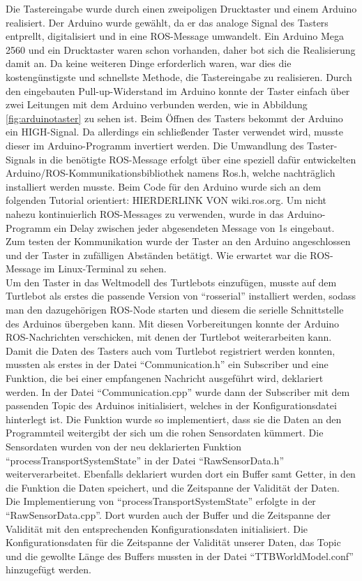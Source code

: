 \documentclass[a4paper,12pt,headsepline]{scrartcl}
\begin{document}
	Die Tastereingabe wurde durch einen zweipoligen Drucktaster und einem Arduino realisiert. Der Arduino wurde gewählt, da er das analoge Signal des Tasters entprellt, digitalisiert und in eine ROS-Message umwandelt. Ein Arduino Mega 2560 und ein Drucktaster waren schon vorhanden, daher bot sich die Realisierung damit an. Da keine weiteren Dinge erforderlich waren, war dies die kostengünstigste und schnellste Methode, die Tastereingabe zu realisieren. Durch den eingebauten Pull-up-Widerstand im Arduino konnte der Taster einfach über zwei Leitungen mit dem Arduino verbunden werden, wie in Abbildung \ref{fig:arduinotaster} zu sehen ist. Beim Öffnen des Tasters bekommt der Arduino ein HIGH-Signal. Da allerdings ein schließender Taster verwendet wird, musste dieser im Arduino-Programm invertiert werden. Die Umwandlung des Taster-Signals in die benötigte ROS-Message erfolgt über eine speziell dafür entwickelten Arduino/ROS-Kommunikationsbibliothek namens \glqq Ros.h\grqq, welche nachträglich installiert werden musste. Beim Code für den Arduino wurde sich an dem folgenden Tutorial orientiert: {HIERDERLINK VON wiki.ros.org}. Um nicht nahezu kontinuierlich ROS-Messages zu verwenden, wurde in das Arduino-Programm ein Delay zwischen jeder abgesendeten Message von 1s eingebaut. Zum testen der Kommunikation wurde der Taster an den Arduino angeschlossen und der Taster in zufälligen Abständen betätigt. Wie erwartet war die ROS-Message im Linux-Terminal zu sehen.\\
Um den Taster in das Weltmodell des Turtlebots einzufügen, musste auf dem Turtlebot als erstes die passende Version von ``rosserial'' installiert werden, sodass man den dazugehörigen ROS-Node starten und diesem die serielle Schnittstelle des Arduinos übergeben kann. Mit diesen Vorbereitungen konnte der Arduino ROS-Nachrichten verschicken, mit denen der Turtlebot weiterarbeiten kann. Damit die Daten des Tasters auch vom Turtlebot registriert werden konnten, mussten als erstes in der Datei ``Communication.h'' ein Subscriber und eine Funktion, die bei einer empfangenen Nachricht ausgeführt wird, deklariert werden. In der Datei ``Communication.cpp'' wurde dann der Subscriber mit dem passenden Topic des Arduinos initialisiert, welches in der Konfigurationsdatei hinterlegt ist. Die Funktion wurde so implementiert, dass sie die Daten an den Programmteil weitergibt der sich um die rohen Sensordaten kümmert. Die Sensordaten wurden von der neu deklarierten Funktion ``processTransportSystemState'' in der Datei ``RawSensorData.h'' weiterverarbeitet. Ebenfalls deklariert wurden dort ein Buffer samt Getter, in den die Funktion die Daten speichert, und die Zeitspanne der Validität der Daten. Die Implementierung von ``processTransportSystemState'' erfolgte in der ``RawSensorData.cpp''. Dort wurden auch der Buffer und die Zeitspanne der Validität mit den entsprechenden Konfigurationsdaten initialisiert. Die Konfigurationsdaten für die Zeitspanne der Validität unserer Daten, das Topic und die gewollte Länge des Buffers mussten in der Datei ``TTBWorldModel.conf'' hinzugefügt werden.\\
\end{document}
